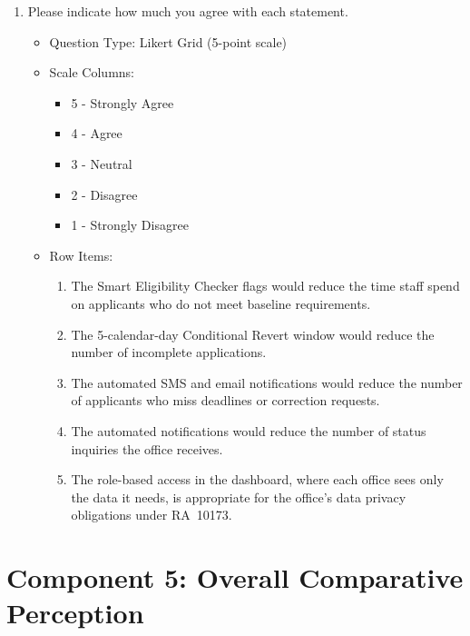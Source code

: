 \begin{enumerate}[resume=q, label={Question \arabic*:}, leftmargin=*, align=left]
  \item Please indicate how much you agree with each statement.
  \begin{itemize}[leftmargin=*]
    \item Question Type: Likert Grid (5-point scale)
    \item Scale Columns:
    \begin{itemize}[leftmargin=*]
      \item 5 - Strongly Agree
      \item 4 - Agree
      \item 3 - Neutral
      \item 2 - Disagree
      \item 1 - Strongly Disagree
    \end{itemize}
    \item Row Items:
    \begin{enumerate}[label=\arabic*., leftmargin=*]
      \item The Smart Eligibility Checker flags would reduce the time staff spend on applicants who do not meet baseline requirements.
      \item The 5-calendar-day Conditional Revert window would reduce the number of incomplete applications.
      \item The automated SMS and email notifications would reduce the number of applicants who miss deadlines or correction requests.
      \item The automated notifications would reduce the number of status inquiries the office receives.
      \item The role-based access in the dashboard, where each office sees only the data it needs, is appropriate for the office's data privacy obligations under RA~10173.
    \end{enumerate}
  \end{itemize}
\end{enumerate}

\section{Component 5: Overall Comparative Perception}

